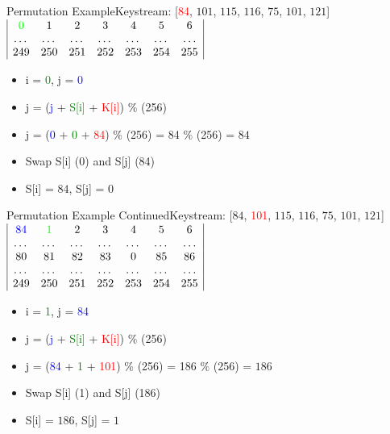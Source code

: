 \documentclass[
	aspectratio=169,	%
	onlytextwidth,		%
	t					%
	]{beamer}
\begin{document}
\begin{frame}{Permutation Example}{Keystream: [\textcolor{red} {84}, $101$, $115$, $116$, $75$, $101$, $121$]}
	\medskip
	$\begin{array}{|ccccccc|}
		\textcolor{green}{0} & 1 & 2 & 3 & 4 & 5 & 6 \\
		\dots & \dots & \dots & \dots & \dots & \dots & \dots \\
		249 & 250 & 251 & 252 & 253 & 254 & 255 \\
	\end{array}$
	\medskip
	\begin{itemize}
		\item i = \textcolor{green}{0}, j = \textcolor{blue}{0}
		\item j = (\textcolor{blue} {j} + \textcolor{green}{S[i]} + \textcolor{red}{K[i]}) $\%$ (256)
		\item j = (\textcolor{blue} {0} + \textcolor{green} {0} + \textcolor{red} {84}) $\%$ (256) = 84 $\%$ (256) = $84$
		\item Swap S[i] (0) and S[j] (84)
		\item S[i] = $84$, S[j] = $0$
	\end{itemize}
\end{frame}

\begin{frame}{Permutation Example Continued}{Keystream: [$84$, \textcolor{red} {101}, $115$, $116$, $75$, $101$, $121$]}
	$\begin{array}{|ccccccc|}
		\textcolor{blue}{84} & \textcolor{green}{1} & 2 & 3 & 4 & 5 & 6 \\
		\dots & \dots & \dots & \dots & \dots & \dots & \dots \\
		80 & 81 & 82 & 83 & 0 & 85 & 86 \\
		\dots & \dots & \dots & \dots & \dots & \dots & \dots \\
		249 & 250 & 251 & 252 & 253 & 254 & 255 \\
	\end{array}$
	\begin{itemize}
		\item i = \textcolor{green}{1}, j = \textcolor{blue} {84}
		\item j = (\textcolor{blue} {j} + \textcolor{green}{S[i]} + \textcolor{red}{K[i]}) $\%$ (256)
		\item j = (\textcolor{blue} {84} + \textcolor{green} {1} + \textcolor{red} {101}) $\%$ (256) = 186 $\%$ (256) = $186$
		\item Swap S[i] (1) and S[j] (186)
		\item S[i] = $186$, S[j] = $1$
	\end{itemize}
\end{frame}
\end{document}
